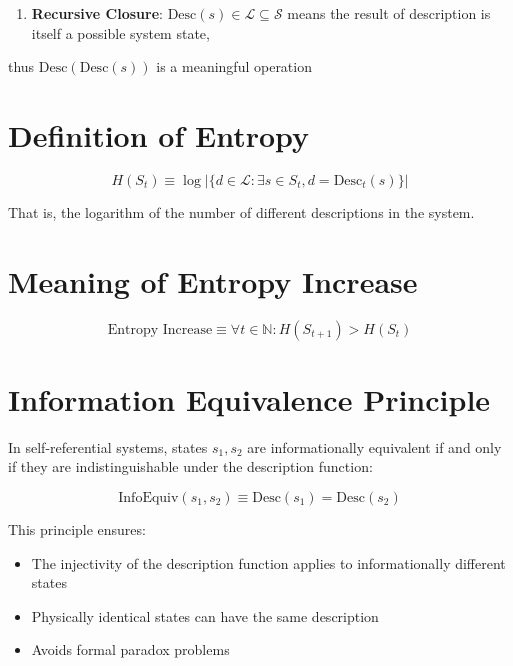 \begin{enumerate}
\item \textbf{Recursive Closure}: $\text{Desc}(s) \in \mathcal{L} \subseteq \mathcal{S}$ means the result of description is itself a possible system state,
\end{enumerate}
  thus $\text{Desc}(\text{Desc}(s))$ is a meaningful operation

\section{Definition of Entropy}
\label{sec:ch01_axiom_and_derivation:definition-of-entropy-clarification-of-h-in-the-axiom}

\begin{equation}
H(S_t) \equiv \log |\{d \in \mathcal{L}: \exists s \in S_t, d = \text{Desc}_t(s)\}|
\end{equation}

That is, the logarithm of the number of different descriptions in the system.

\section{Meaning of Entropy Increase}
\label{sec:ch01_axiom_and_derivation:meaning-of-entropy-increase-clarification-of-necessarily-increase-in-entropy-in-the-axiom}

\begin{equation}
\text{Entropy Increase} \equiv \forall t \in \mathbb{N}: H(S_{t+1}) > H(S_t)
\end{equation}

\section{Information Equivalence Principle}
\label{sec:ch01_axiom_and_derivation:information-equivalence-principle-technical-clarification-of-the-axiom}

In self-referential systems, states $s_1, s_2$ are informationally equivalent if and only if they are indistinguishable under the description function:

\begin{equation}
\text{InfoEquiv}(s_1, s_2) \equiv \text{Desc}(s_1) = \text{Desc}(s_2)
\end{equation}

This principle ensures:
\begin{itemize}
\item The injectivity of the description function applies to informationally different states
\item Physically identical states can have the same description
\item Avoids formal paradox problems
\end{itemize}


